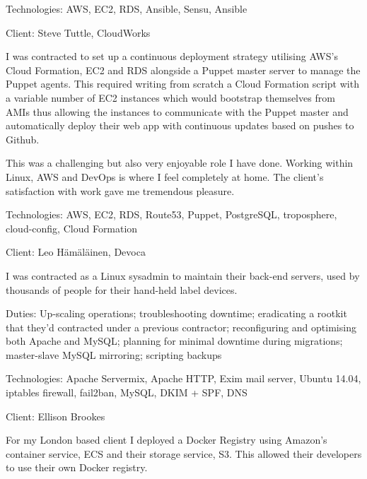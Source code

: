 \documentclass[12pt]{article}
\newenvironment{outerlist}[1][\enskip\textbullet]%
	{\begin{itemize}[#1]}{\end{itemize}%
		\vspace{-.6\baselineskip}}
\newenvironment{innerlist}[1][\enskip\textbullet]%
	{\begin{compactitem}[#1]}{\end{compactitem}}
\begin{document}
\begin{outerlist}
\begin{innerlist}
				\item Technologies: AWS, EC2, RDS, Ansible, Sensu, Ansible
			\end{innerlist}
			\item[] Client: Steve Tuttle, CloudWorks
			\begin{innerlist}
				\item I was contracted to set up a continuous deployment strategy utilising AWS's Cloud Formation, EC2 and RDS alongside a Puppet master server to manage the Puppet agents. This required writing from scratch a Cloud Formation script with a variable number of EC2 instances which would bootstrap themselves from AMIs thus allowing the instances to communicate with the Puppet master and automatically deploy their web app with continuous updates based on pushes to Github.
				\item This was a  challenging but also very enjoyable role I have done. Working within Linux, AWS and DevOps is where I feel completely at home. The client's satisfaction with work gave me tremendous pleasure.
				\item Technologies: AWS, EC2, RDS, Route53, Puppet, PostgreSQL, troposphere, cloud-config, Cloud Formation
			\end{innerlist}
			\item[] Client: Leo Hämäläinen, Devoca
			\begin{innerlist}
				\item I was contracted as a Linux sysadmin to maintain their back-end servers, used by thousands of people for their hand-held label devices.
				\item Duties: Up-scaling operations; troubleshooting downtime; eradicating a rootkit that they'd contracted under a previous contractor; reconfiguring and optimising both Apache and MySQL; planning for minimal downtime during migrations; master-slave MySQL mirroring; scripting backups
				\item Technologies: Apache Servermix, Apache HTTP, Exim mail server, Ubuntu 14.04, iptables firewall, fail2ban, MySQL, DKIM + SPF, DNS
			\end{innerlist}
			\item[] Client: Ellison Brookes
			\begin{innerlist}
				\item For my London based client I deployed a Docker Registry using Amazon's container service, ECS and their storage service, S3. This allowed their developers to use their own Docker registry.
			\end{innerlist}
		\end{outerlist}
		
\end{document}
